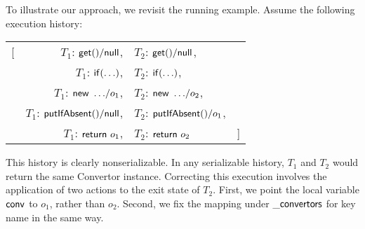 To illustrate our approach, we revisit the running example. Assume the following execution history: %
	\begin{center}
		\footnotesize
		\begin{tabular}{rrll}
			[ & $T_1$: ${\sf get()}/{\sf null}$, & $T_2$: ${\sf get()}/{\sf null}$,  & \\
			& $T_1$: ${\sf if(\ldots)}$, & $T_2$: ${\sf if(\ldots)}$, & \\ 
			& $T_1$: ${\sf new\ \ldots}/o_1$, & $T_2$: ${\sf new\ \ldots}/o_2$, & \\ 
			& $T_1$: ${\sf putIfAbsent()}/{\sf null}$, & $T_2$: ${\sf putIfAbsent()}/o_1$,  & \\ 
			& $T_1$: ${\sf return}\ o_1$, & $T_2$: ${\sf return}\ o_2$ & ]
		\end{tabular}
		\end{center}
This history is clearly nonserializable. In any serializable history, $T_1$ and $T_2$ would return the same {\sf Convertor} instance. Correcting this execution involves the application of two actions to the exit state of $T_2$. First, we point the local variable ${\sf conv}$ to $o_1$, rather than $o_2$. Second, we fix the mapping under ${\sf \_convertors}$ for key {\sf name} in the same way.

